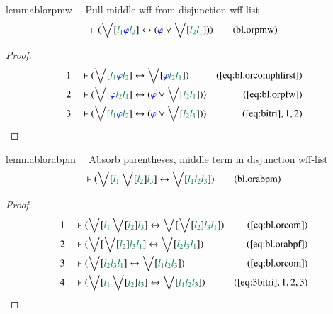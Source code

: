 \begin{restatable}{lemma}{blorpmw}~~ Pull middle wff from disjunction wff-list
\begin{align}
\vdash ( \bigvee[ \mwl{l_1} \mw{\varphi} \mwl{l_2} ] \leftrightarrow (
    \mw{\varphi} \vee \bigvee[ \mwl{l_2} \mwl{l_1} ] )
    )\label{eq:bl.orpmw}\tag{bl.orpmw}
\end{align}
\end{restatable}

\begin{proof}
\begin{align}
  1 &&  & \vdash ( \bigvee[ \mwl{l_1} \mw{\varphi} \mwl{l_2} ] \leftrightarrow
      \bigvee[ \mw{\varphi} \mwl{l_2} \mwl{l_1} ]
      )&(\mbox{\ref{eq:bl.orcomphfirst}})\notag
  \\ 2 &&  & \vdash ( \bigvee[ \mw{\varphi} \mwl{l_2} \mwl{l_1} ]
      \leftrightarrow ( \mw{\varphi} \vee \bigvee[
      \mwl{l_2} \mwl{l_1} ] )
      )&(\mbox{\ref{eq:bl.orpfw}})\notag
  \\ 3 &&  & \vdash ( \bigvee[ \mwl{l_1} \mw{\varphi} \mwl{l_2} ]
      \leftrightarrow ( \mw{\varphi} \vee \bigvee[
      \mwl{l_2} \mwl{l_1} ] )
      )&(\mbox{\ref{eq:bitri}},1,2)\notag
\end{align}
\end{proof}

\begin{restatable}{lemma}{blorabpm}~~ Absorb parentheses, middle term in
disjunction wff-list
\begin{align}
\vdash ( \bigvee[ \mwl{l_1} \bigvee[ \mwl{l_2} ] \mwl{l_3} ] \leftrightarrow
    \bigvee[ \mwl{l_1} \mwl{l_2} \mwl{l_3} ]
    )\label{eq:bl.orabpm}\tag{bl.orabpm}
\end{align}
\end{restatable}

\begin{proof}
\begin{align}
  1 &&  & \vdash ( \bigvee[ \mwl{l_1} \bigvee[ \mwl{l_2} ] \mwl{l_3} ]
      \leftrightarrow \bigvee[ \bigvee[ \mwl{l_2} ]
      \mwl{l_3} \mwl{l_1} ]
      )&(\mbox{\ref{eq:bl.orcom}})\notag
  \\ 2 &&  & \vdash ( \bigvee[ \bigvee[ \mwl{l_2} ] \mwl{l_3} \mwl{l_1} ]
      \leftrightarrow \bigvee[ \mwl{l_2} \mwl{l_3}
      \mwl{l_1} ] )&(\mbox{\ref{eq:bl.orabpf}})\notag
  \\ 3 &&  & \vdash ( \bigvee[ \mwl{l_2} \mwl{l_3} \mwl{l_1} ] \leftrightarrow
      \bigvee[ \mwl{l_1} \mwl{l_2} \mwl{l_3} ]
      )&(\mbox{\ref{eq:bl.orcom}})\notag
  \\ 4 &&  & \vdash ( \bigvee[ \mwl{l_1} \bigvee[ \mwl{l_2} ] \mwl{l_3} ]
      \leftrightarrow \bigvee[ \mwl{l_1} \mwl{l_2}
      \mwl{l_3} ] )&(\mbox{\ref{eq:3bitri}},1,2,3)\notag
\end{align}
\end{proof}

